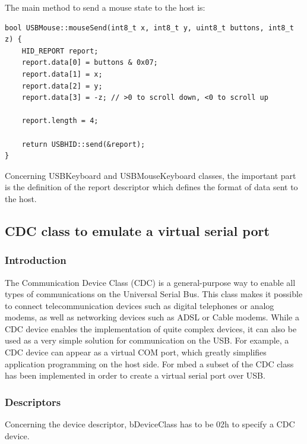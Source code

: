 \documentclass[pdftex,10pt,a4paper]{report}
\begin{document}
The main method to send a mouse state to the host is:

\begin{lstlisting}[label=Mouse Report Descriptor,caption=Mouse Report Descriptor]
bool USBMouse::mouseSend(int8_t x, int8_t y, uint8_t buttons, int8_t z) {
    HID_REPORT report;
    report.data[0] = buttons & 0x07;
    report.data[1] = x;
    report.data[2] = y;
    report.data[3] = -z; // >0 to scroll down, <0 to scroll up

    report.length = 4;

    return USBHID::send(&report);
}
\end{lstlisting}

Concerning USBKeyboard and USBMouseKeyboard classes, the important part is the definition of the report descriptor which defines the format of data sent to the host. 



\subsection{CDC class to emulate a virtual serial port}
\subsubsection{Introduction}
The Communication Device Class (CDC) is a general-purpose way to enable all
types of communications on the Universal Serial Bus. This class makes it possible
to connect telecommunication devices such as digital telephones or analog
modems, as well as networking devices such as ADSL or Cable modems.
While a CDC device enables the implementation of quite complex devices, it can also
be used as a very simple solution for communication on the USB. For example, a CDC
device can appear as a virtual COM port, which greatly simplifies application programming
on the host side. For mbed a subset of the CDC class has been implemented in order to create
a virtual serial port over USB.

\subsubsection{Descriptors}
Concerning the device descriptor, bDeviceClass has to be 02h to specify a CDC device.\\
\end{document}
